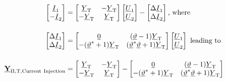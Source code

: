 \begin{align}
    \begin{bmatrix}
        \underline{I}_1 \\
        -\underline{I}_2
    \end{bmatrix} &=
    \begin{bmatrix}
        \underline{Y}_\mathrm{T} & -\underline{Y}_\mathrm{T} \\
        -\underline{Y}_\mathrm{T} & \underline{Y}_\mathrm{T}
    \end{bmatrix}
    \begin{bmatrix}
        \underline{U}_1 \\
        \underline{U}_2
    \end{bmatrix} -
    \begin{bmatrix}
        \Delta \underline{I}_1 \\
        \Delta \underline{I}_2
    \end{bmatrix}\text{, where } \notag \\[12pt]
    \begin{bmatrix}
        \Delta \underline{I}_1 \\
        \Delta \underline{I}_2
    \end{bmatrix} &=
    \begin{bmatrix}
        \underline{0} & (\underline{\vartheta}-1)\underline{Y}_\mathrm{T} \\
        -(\underline{\vartheta}^*+1)\underline{Y}_\mathrm{T} & (\underline{\vartheta}^*\underline{\vartheta}+1)\underline{Y}_\mathrm{T}
    \end{bmatrix}
    \begin{bmatrix}
        \underline{U}_1 \\
        \underline{U}_2
    \end{bmatrix} \text{ leading to } \notag \\[12pt]
    \underline{\mab{Y}}_\mathrm{\Pi,T,Current~Injection}&= 
    \begin{bmatrix}
        \underline{Y}_\mathrm{T} & -\underline{Y}_\mathrm{T} \\
        -\underline{Y}_\mathrm{T} & \underline{Y}_\mathrm{T}
    \end{bmatrix} -
    \begin{bmatrix}
        \underline{0} & (\underline{\vartheta}-1)\underline{Y}_\mathrm{T} \\
        -(\underline{\vartheta}^*+1)\underline{Y}_\mathrm{T} & (\underline{\vartheta}^*\underline{\vartheta}+1)\underline{Y}_\mathrm{T}
    \end{bmatrix} \notag %
\end{align}

